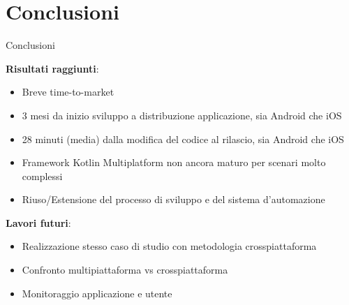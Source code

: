 
\section{Conclusioni}

\begin{frame}{Conclusioni}

    \textbf{Risultati raggiunti}:
    \begin{itemize}
        \item Breve time-to-market
        \item 3 mesi da inizio sviluppo a distribuzione applicazione, sia Android che iOS
        \item 28 minuti (media) dalla modifica del codice al rilascio, sia Android che iOS
        \item Framework Kotlin Multiplatform non ancora maturo per scenari molto complessi
        \item Riuso/Estensione del processo di sviluppo e del sistema d'automazione
    \end{itemize}

    \vspace{3mm}

    \textbf{Lavori futuri}:
    \begin{itemize}
        \item Realizzazione stesso caso di studio con metodologia crosspiattaforma
        \item Confronto multipiattaforma vs crosspiattaforma
        \item Monitoraggio applicazione e utente
    \end{itemize}
    
\end{frame}
